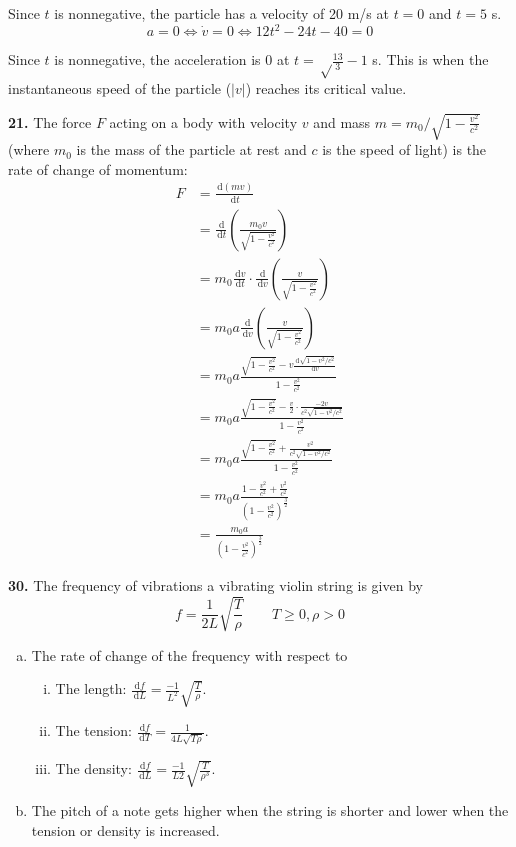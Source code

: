 \documentclass[a4paper,12pt]{article}
\newcommand{\ud}{\,\mathrm{d}}
\begin{document}
Since $t$ is nonnegative, the particle has a velocity of 20 m/s at $t = 0$ and
$t = 5$ s.
\[a = 0 \iff \dot{v} = 0 \iff 12t^2 - 24t - 40 = 0 \tag{b}\]

Since $t$ is nonnegative, the acceleration is 0 at $t = \sqrt\frac{13}{3} - 1$
s. This is when the instantaneous speed of the particle ($|v|$) reaches its
critical value.

\noindent\textbf{21. }The force $F$ acting on a body with velocity $v$ and mass
$m = m_0 \Big/ \sqrt{1 - \frac{v^2}{c^2}}$ (where $m_0$ is the mass of the particle
at rest and $c$ is the speed of light) is the rate of change of momentum:
\begin{align*}
F &= \frac{\ud(mv)}{\ud t}\\
  &= \frac{\ud}{\ud t}\left(\frac{m_0v}{\sqrt{1 - \frac{v^2}{c^2}}}\right)\\
  &= m_0\frac{\ud v}{\ud t}\cdot
     \frac{\ud}{\ud v}\left(\frac{v}{\sqrt{1 - \frac{v^2}{c^2}}}\right)\\
  &= m_0a\frac{\ud}{\ud v}\left(\frac{v}{\sqrt{1 - \frac{v^2}{c^2}}}\right)\\
  &= m_0a\frac{\sqrt{1 - \frac{v^2}{c^2}}
               - v\frac{\ud\sqrt{1 - v^2/c^2}}{\ud v}}
              {1 - \frac{v^2}{c^2}}\\
  &= m_0a\frac{\sqrt{1 - \frac{v^2}{c^2}}
               - \frac{v}{2}\cdot\frac{-2v}{c^2\sqrt{1 - v^2/c^2}}}
              {1 - \frac{v^2}{c^2}}\\
  &= m_0a\frac{\sqrt{1 - \frac{v^2}{c^2}} + \frac{v^2}{c^2\sqrt{1 - v^2/c^2}}}
              {1 - \frac{v^2}{c^2}}\\
  &= m_0a\frac{1 - \frac{v^2}{c^2} + \frac{v^2}{c^2}}
              {\left(1 - \frac{v^2}{c^2}\right)^\frac{3}{2}}\\
  &= \frac{m_0a}{\left(1 - \frac{v^2}{c^2}\right)^\frac{3}{2}}
\end{align*}

\noindent\textbf{30. }The frequency of vibrations a vibrating violin string is
given by \[f = \frac{1}{2L}\sqrt{\frac{T}{\rho}} \qquad T \geq 0, \rho > 0\]
\begin{enumerate}[(a)]
  \item The rate of change of the frequency with respect to
    \begin{enumerate}[(i)]
      \item The length:
        $\frac{\ud f}{\ud L} = \frac{-1}{L^2}\sqrt{\frac{T}{\rho}}$.
      \item The tension: $\frac{\ud f}{\ud T} = \frac{1}{4L\sqrt{T\rho}}$.
      \item The density:
        $\frac{\ud f}{\ud L} = \frac{-1}{L2}\sqrt{\frac{T}{\rho^3}}$.
    \end{enumerate}
  \item The pitch of a note gets higher when the string is shorter and lower
    when the tension or density is increased.
\end{enumerate}
\end{document}
